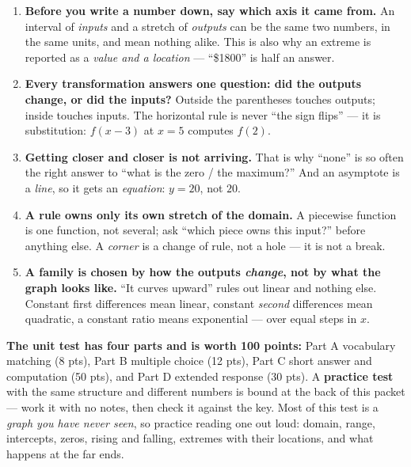 \boxguard[16]
\begin{spiralbox}
\small
\begin{enumerate}[leftmargin=1.5em, itemsep=3pt, topsep=2pt]
  \item \textbf{Before you write a number down, say which axis it came from.} An interval of
        \emph{inputs} and a stretch of \emph{outputs} can be the same two numbers, in the same
        units, and mean nothing alike. This is also why an extreme is reported as a
        \emph{value and a location} --- ``\$1800'' is half an answer.
  \item \textbf{Every transformation answers one question: did the outputs change, or did the
        inputs?} Outside the parentheses touches outputs; inside touches inputs. The horizontal
        rule is never ``the sign flips'' --- it is substitution: $f(x-3)$ at $x=5$ computes $f(2)$.
  \item \textbf{Getting closer and closer is not arriving.} That is why ``none'' is so often the
        right answer to ``what is the zero / the maximum?'' And an asymptote is a \emph{line}, so
        it gets an \emph{equation}: $y=20$, not $20$.
  \item \textbf{A rule owns only its own stretch of the domain.} A piecewise function is one
        function, not several; ask ``which piece owns this input?'' before anything else. A
        \emph{corner} is a change of rule, not a hole --- it is not a break.
  \item \textbf{A family is chosen by how the outputs \emph{change}, not by what the graph looks
        like.} ``It curves upward'' rules out linear and nothing else. Constant first differences
        mean linear, constant \emph{second} differences mean quadratic, a constant ratio means
        exponential --- over equal steps in $x$.
\end{enumerate}
\end{spiralbox}

\vspace{0.12in}

\boxguard[8]
\begin{remindbox}
\small
\textbf{The unit test has four parts and is worth 100 points:} Part A vocabulary matching
(8 pts), Part B multiple choice (12 pts), Part C short answer and computation (50 pts), and
Part D extended response (30 pts). A \textbf{practice test} with the same structure and
different numbers is bound at the back of this packet --- work it with no notes, then check it
against the key. Most of this test is a \emph{graph you have never seen}, so practice reading
one out loud: domain, range, intercepts, zeros, rising and falling, extremes with their
locations, and what happens at the far ends.
\end{remindbox}
